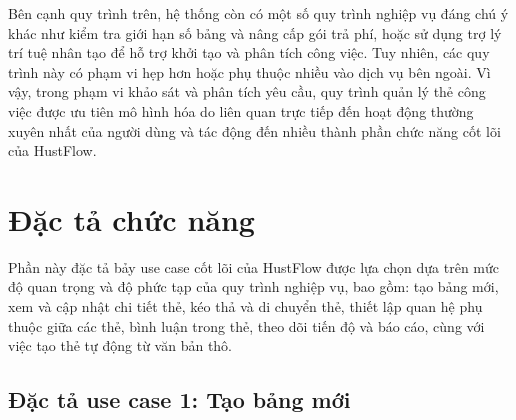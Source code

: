 \documentclass[../DoAn.tex]{subfiles}
\begin{document}
Bên cạnh quy trình trên, hệ thống còn có một số quy trình nghiệp vụ đáng chú ý khác như kiểm tra giới hạn số bảng và nâng cấp gói trả phí, hoặc sử dụng trợ lý trí tuệ nhân tạo để hỗ trợ khởi tạo và phân tích công việc. Tuy nhiên, các quy trình này có phạm vi hẹp hơn hoặc phụ thuộc nhiều vào dịch vụ bên ngoài. Vì vậy, trong phạm vi khảo sát và phân tích yêu cầu, quy trình quản lý thẻ công việc được ưu tiên mô hình hóa do liên quan trực tiếp đến hoạt động thường xuyên nhất của người dùng và tác động đến nhiều thành phần chức năng cốt lõi của HustFlow.

\section{Đặc tả chức năng}
\label{section:2.3}
Phần này đặc tả bảy use case cốt lõi của HustFlow được lựa chọn dựa trên mức độ quan trọng và độ phức tạp của quy trình nghiệp vụ, bao gồm: tạo bảng mới, xem và cập nhật chi tiết thẻ, kéo thả và di chuyển thẻ, thiết lập quan hệ phụ thuộc giữa các thẻ, bình luận trong thẻ, theo dõi tiến độ và báo cáo, cùng với việc tạo thẻ tự động từ văn bản thô.

\newcommand{\ucfield}[1]{\cellcolor{ucBlue!85}\rule{0pt}{3.1ex}\textbf{#1}}
\newcommand{\ucfieldalt}[1]{\cellcolor{ucOrange!70}\rule{0pt}{3.1ex}\textbf{#1}}
\newcommand{\uccell}[1]{\begin{minipage}[t]{\linewidth}#1\par\vspace{3pt}\end{minipage}}

\subsection{Đặc tả use case 1: Tạo bảng mới}
\label{subsection:2.3.1}
\end{document}
